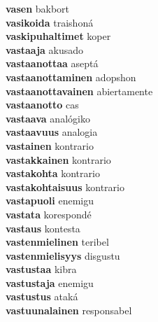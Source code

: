 \textbf{vasen } bakbort \\
\textbf{vasikoida } traishoná \\
\textbf{vaskipuhaltimet } koper \\
\textbf{vastaaja } akusado \\
\textbf{vastaanottaa } aseptá \\
\textbf{vastaanottaminen } adopshon \\
\textbf{vastaanottavainen } abiertamente \\
\textbf{vastaanotto } cas \\
\textbf{vastaava } analógiko \\
\textbf{vastaavuus } analogia \\
\textbf{vastainen } kontrario \\
\textbf{vastakkainen } kontrario \\
\textbf{vastakohta } kontrario \\
\textbf{vastakohtaisuus } kontrario \\
\textbf{vastapuoli } enemigu \\
\textbf{vastata } korespondé \\
\textbf{vastaus } kontesta \\
\textbf{vastenmielinen } teribel \\
\textbf{vastenmielisyys } disgustu \\
\textbf{vastustaa } kibra \\
\textbf{vastustaja } enemigu \\
\textbf{vastustus } ataká \\
\textbf{vastuunalainen } responsabel \\
